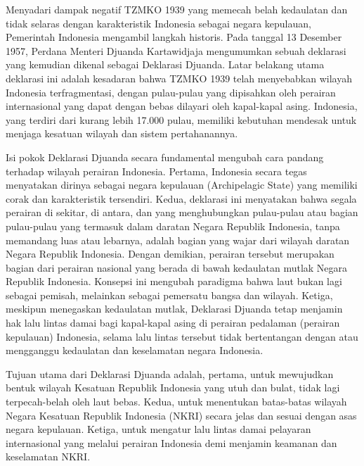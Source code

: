 \documentclass[12pt, a4paper]{article}
\begin{document}
Menyadari dampak negatif TZMKO 1939 yang memecah belah kedaulatan dan tidak selaras dengan karakteristik Indonesia sebagai negara kepulauan, Pemerintah Indonesia mengambil langkah historis. Pada tanggal 13 Desember 1957, Perdana Menteri Djuanda Kartawidjaja mengumumkan sebuah deklarasi yang kemudian dikenal sebagai Deklarasi Djuanda. Latar belakang utama deklarasi ini adalah kesadaran bahwa TZMKO 1939 telah menyebabkan wilayah Indonesia terfragmentasi, dengan pulau-pulau yang dipisahkan oleh perairan internasional yang dapat dengan bebas dilayari oleh kapal-kapal asing. Indonesia, yang terdiri dari kurang lebih 17.000 pulau, memiliki kebutuhan mendesak untuk menjaga kesatuan wilayah dan sistem pertahanannya.  

Isi pokok Deklarasi Djuanda secara fundamental mengubah cara pandang terhadap wilayah perairan Indonesia. Pertama, Indonesia secara tegas menyatakan dirinya sebagai negara kepulauan (Archipelagic State) yang memiliki corak dan karakteristik tersendiri. Kedua, deklarasi ini menyatakan bahwa segala perairan di sekitar, di antara, dan yang menghubungkan pulau-pulau atau bagian pulau-pulau yang termasuk dalam daratan Negara Republik Indonesia, tanpa memandang luas atau lebarnya, adalah bagian yang wajar dari wilayah daratan Negara Republik Indonesia. Dengan demikian, perairan tersebut merupakan bagian dari perairan nasional yang berada di bawah kedaulatan mutlak Negara Republik Indonesia. Konsepsi ini mengubah paradigma bahwa laut bukan lagi sebagai pemisah, melainkan sebagai pemersatu bangsa dan wilayah. Ketiga, meskipun menegaskan kedaulatan mutlak, Deklarasi Djuanda tetap menjamin hak lalu lintas damai bagi kapal-kapal asing di perairan pedalaman (perairan kepulauan) Indonesia, selama lalu lintas tersebut tidak bertentangan dengan atau mengganggu kedaulatan dan keselamatan negara Indonesia.  

Tujuan utama dari Deklarasi Djuanda adalah, pertama, untuk mewujudkan bentuk wilayah Kesatuan Republik Indonesia yang utuh dan bulat, tidak lagi terpecah-belah oleh laut bebas. Kedua, untuk menentukan batas-batas wilayah Negara Kesatuan Republik Indonesia (NKRI) secara jelas dan sesuai dengan asas negara kepulauan. Ketiga, untuk mengatur lalu lintas damai pelayaran internasional yang melalui perairan Indonesia demi menjamin keamanan dan keselamatan NKRI.  
\end{document}

